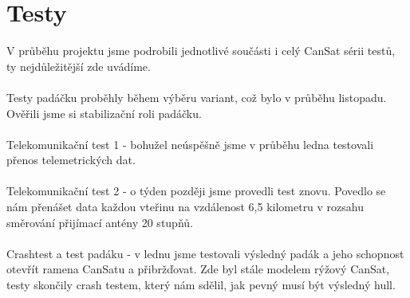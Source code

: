 \documentclass[a4paper]{report}
\begin{document}
\section{Testy}
V průběhu projektu jsme podrobili jednotlivé součásti i celý CanSat sérii testů, ty nejdůležitější zde uvádíme.
\paragraph{} Testy padáčku proběhly během výběru variant, což bylo v průběhu listopadu. Ověřili jsme si stabilizační roli padáčku.
\paragraph{} Telekomunikační test 1 - bohužel neúspěšně jsme v průběhu ledna testovali přenos telemetrických dat.
\paragraph{} Telekomunikační test 2 - o týden později jsme provedli test znovu. Povedlo se nám přenášet data každou vteřinu na vzdálenost 6,5 kilometru v rozsahu směrování přijímací antény 20 stupňů.
\paragraph{} Crashtest a test padáku - v lednu jsme testovali výsledný padák a jeho schopnost otevřít ramena CanSatu a přibržďovat. Zde byl stále modelem rýžový CanSat, testy skončily crash testem, který nám sdělil, jak pevný musí být výsledný hull.
\end{document}
